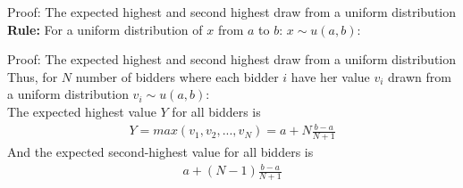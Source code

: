 \begin{frame}{Proof: The expected highest and second highest draw from a uniform distribution}
    \textbf{Rule:}
    For a uniform distribution of $x$ from $a$ to $b$: $x\sim u(a,b)$:
\end{frame}



\begin{frame}{Proof: The expected highest and second highest draw from a uniform distribution}
    Thus, for $N$ number of bidders where each bidder $i$ have her value $v_i$ drawn from a uniform distribution $v_i\sim u(a,b)$:\\\medskip
    The expected highest value $Y$ for all bidders is
    \begin{align*}
      Y=max(v_1,v_2,...,v_N)=a+N\frac{b-a}{N+1}
    \end{align*}
    And the expected second-highest value for all bidders is
    \begin{align*}
      a+(N-1)\frac{b-a}{N+1}
    \end{align*}
    \vfill\null
\end{frame}
